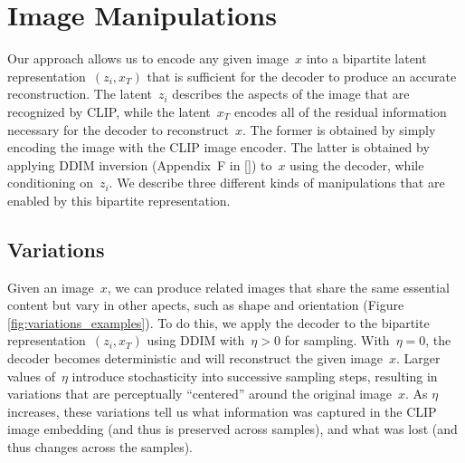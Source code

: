 \section{Image Manipulations}

Our approach allows us to encode any given image~$x$ into a bipartite latent representation~$(z_i, x_T)$ that is sufficient for the decoder to produce an accurate reconstruction. The latent~$z_i$ describes the aspects of the image that are recognized by CLIP, while the latent~$x_T$ encodes all of the residual information necessary for the decoder to reconstruct~$x$. The former is obtained by simply encoding the image with the CLIP image encoder. The latter is obtained by applying DDIM inversion (Appendix~F in []) to~$x$ using the decoder, while conditioning on~$z_i$. We describe three different kinds of manipulations that are enabled by this bipartite representation.

\subsection{Variations}
\label{sec:variations}

Given an image~$x$, we can produce related images that share the same essential content but vary in other apects, such as shape and orientation (Figure \ref{fig:variations_examples}). To do this, we apply the decoder to the bipartite representation~$(z_i, x_T)$ using DDIM with~$\eta > 0$ for sampling. With~$\eta = 0$, the decoder becomes deterministic and will reconstruct the given image~$x$. Larger values of~$\eta$ introduce stochasticity into successive sampling steps, resulting in variations that are perceptually ``centered'' around the original image~$x$. As $\eta$ increases, these variations tell us what information was captured in the CLIP image embedding (and thus is preserved across samples), and what was lost (and thus changes across the samples).

